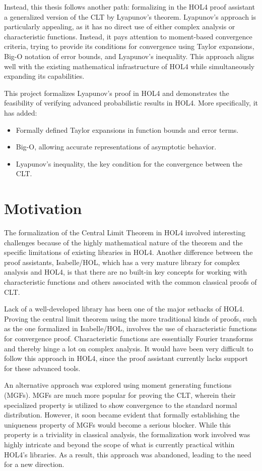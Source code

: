 Instead, this thesis follows another path: formalizing in the HOL4 proof assistant a generalized version of the CLT by Lyapunov's theorem. Lyapunov's approach is particularly appealing, as it has no direct use of either complex analysis or characteristic functions. Instead, it pays attention to moment-based convergence criteria, trying to provide its conditions for convergence using Taylor expansions, Big-O notation of error bounds, and Lyapunov's inequality. This approach aligns well with the existing mathematical infrastructure of HOL4 while simultaneously expanding its capabilities.

This project formalizes Lyapunov's proof in HOL4 and demonstrates the feasibility of verifying advanced probabilistic results in HOL4. More specifically, it has added:
\begin{itemize}
    \item Formally defined Taylor expansions in function bounds and error terms.
    \item Big-O, allowing accurate representations of asymptotic behavior.
    \item Lyapunov's inequality, the key condition for the convergence between the CLT.
\end{itemize}


\section{Motivation}
The formalization of the Central Limit Theorem in HOL4 involved interesting challenges because of the highly mathematical nature of the theorem and the specific limitations of existing libraries in HOL4. Another difference between the proof assistants, Isabelle/HOL, which has a very mature library for complex analysis and HOL4, is that there are no built-in key concepts for working with characteristic functions and others associated with the common classical proofs of CLT.

Lack of a well-developed library has been one of the major setbacks of HOL4. Proving the central limit theorem using the more traditional kinds of proofs, such as the one formalized in Isabelle/HOL, involves the use of characteristic functions for convergence proof. Characteristic functions are essentially Fourier transforms and thereby hinge a lot on complex analysis. It would have been very difficult to follow this approach in HOL4, since the proof assistant currently lacks support for these advanced tools.

An alternative approach was explored using moment generating functions (MGFs). MGFs are much more popular for proving the CLT, wherein their specialized property is utilized to show convergence to the standard normal distribution. However, it soon became evident that formally establishing the uniqueness property of MGFs would become a serious blocker. While this property is a triviality in classical analysis, the formalization work involved was highly intricate and beyond the scope of what is currently practical within HOL4's libraries. As a result, this approach was abandoned, leading to the need for a new direction.

